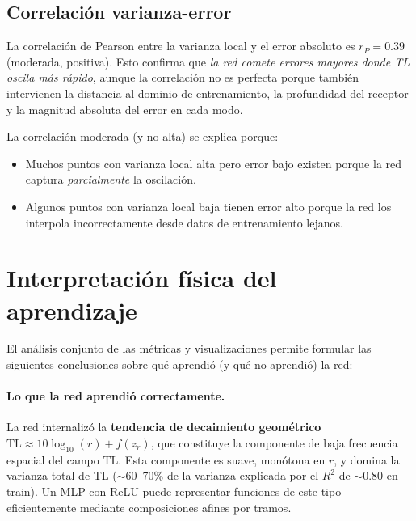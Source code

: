 \documentclass[12pt,a4paper]{article}
\newcommand{\TL}{\mathrm{TL}}
\begin{document}
\subsection{Correlación varianza-error}

La correlación de Pearson entre la varianza local y el error absoluto es
$r_P = 0.39$ (moderada, positiva). Esto confirma que \emph{la red comete
errores mayores donde TL oscila más rápido}, aunque la correlación no es
perfecta porque también intervienen la distancia al dominio de entrenamiento,
la profundidad del receptor y la magnitud absoluta del error en cada modo.

La correlación moderada (y no alta) se explica porque:
\begin{itemize}
  \item Muchos puntos con varianza local alta pero error bajo existen porque
        la red captura \emph{parcialmente} la oscilación.
  \item Algunos puntos con varianza local baja tienen error alto porque la
        red los interpola incorrectamente desde datos de entrenamiento lejanos.
\end{itemize}

\section{Interpretación física del aprendizaje}

El análisis conjunto de las métricas y visualizaciones permite formular las
siguientes conclusiones sobre qué aprendió (y qué no aprendió) la red:

\paragraph{Lo que la red aprendió correctamente.}
La red internalizó la \textbf{tendencia de decaimiento geométrico}
$\TL \approx 10\log_{10}(r) + f(z_r)$, que constituye la componente de baja
frecuencia espacial del campo TL. Esta componente es suave, monótona en $r$,
y domina la varianza total de TL ($\sim$60--70\% de la varianza explicada por
el $R^2$ de $\sim$0.80 en train). Un MLP con ReLU puede representar funciones
de este tipo eficientemente mediante composiciones afines por tramos.
\end{document}

